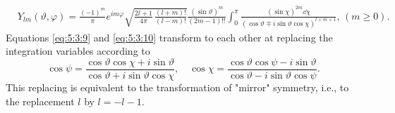 \begin{enumerate}[label=(\alph*)]
\begin{align}
& Y_{l m}(\vartheta, \varphi)=\frac{(-1)^{m}}{\pi} e^{i m \varphi} \sqrt{\frac{2 l+1}{4 \pi} \, \frac{(l+m)!}{(l-m)!}} \frac{(\sin \vartheta)^{m}}{(2 m-1)!!} \int_{0}^{\pi} \frac{(\sin \chi)^{2 m} \dd \chi}{(\cos \vartheta \mp i \sin \vartheta \cos \chi)^{l+m+1}},\,(m \geq 0). \label{eq:5:3:10}
\end{align}
Equations \eqref{eq:5:3:9} and \eqref{eq:5:3:10} transform to each other at replacing the integration variables according to
\begin{equation}
\cos \psi=\frac{\cos \vartheta \cos \chi+i \sin \vartheta}{\cos \vartheta+i \sin \vartheta \cos \chi}, \quad \cos \chi=\frac{\cos \vartheta \cos \psi-i \sin \vartheta}{\cos \vartheta-i \sin \vartheta \cos \psi} . \label{eq:5:3:11}
\end{equation}
This replacing is equivalent to the transformation of "mirror" symmetry, i.e., to the replacement $l$ by $l=-l-1$.
\end{enumerate}

